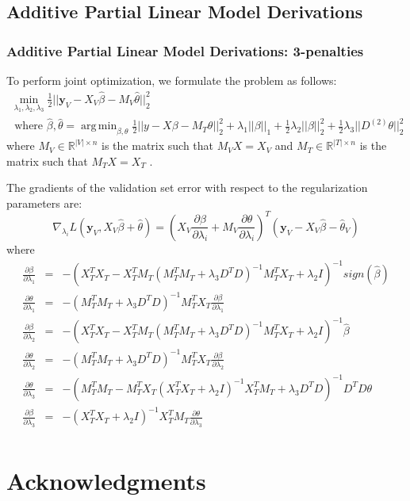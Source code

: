 \documentclass[10pt,letterpaper]{article}
\DeclareMathOperator*{\argmin}{arg\,min}
\begin{document}
\subsection{Additive Partial Linear Model Derivations}

\subsubsection{Additive Partial Linear Model Derivations: 3-penalties}

To perform joint optimization, we formulate the problem as follows:
\begin{multline}
\min_{\lambda_1, \lambda_2, \lambda_3} \frac{1}{2} \bigl\lvert\bigl\lvert \boldsymbol y_V - X_V\hat\beta - M_V \hat\theta \bigl\rvert\bigl\rvert^2_2 \\
\text{ where } \hat\beta, \hat\theta = \argmin_{\beta, \theta} \frac{1}{2} \bigl\lvert\bigl\lvert y - X\beta - M_T \theta \bigl\rvert\bigl\rvert^2_2
+ \lambda_1 \lvert\lvert \beta \rvert \rvert_1
+ \frac{1}{2} \lambda_2 \lvert\lvert \beta \rvert \rvert_2^2
+ \frac{1}{2} \lambda_3 \lvert\lvert D^{(2)} \theta \rvert \rvert_2^2
\end{multline}
where $M_V \in \mathbb{R}^{|V| \times n}$ is the matrix such that $M_V X = X_V$ and $M_T \in \mathbb{R}^{|T| \times n}$ is the matrix such that $M_T X = X_T$ .

The gradients of the validation set error with respect to the regularization parameters are:
\begin{equation}
\nabla_{\lambda_i} L(\boldsymbol y_V, X_V \hat \beta + \hat \theta) = (X_V \frac{\partial \beta}{\partial \lambda_i} + M_V \frac{\partial \theta}{\partial \lambda_i})^T(\boldsymbol y_V - X_V \hat \beta - \hat \theta_V)
\end{equation}
where
\begin{equation}
\begin{array}{lcl}
\frac{\partial \beta}{\partial \lambda_1} &=& -(X_T^T X_T - X_T^T M_T(M_T^T M_T + \lambda_3 D^TD)^{-1} M_T^T X_T + \lambda_2 I)^{-1} sign(\hat \beta) \\
\frac{\partial \theta}{\partial \lambda_1} &=& -(M_T^T M_T + \lambda_3 D^T D)^{-1}  M_T^T X_T \frac{\partial \beta}{\partial \lambda_1}
\\
\frac{\partial \beta}{\partial \lambda_2} &=& -(X_T^T X_T - X_T^T M_T(M_T^T M_T + \lambda_3 D^TD)^{-1} M_T^T X_T + \lambda_2 I)^{-1} \hat \beta \\
\frac{\partial \theta}{\partial \lambda_2} &=& -(M_T^T M_T + \lambda_3 D^T D)^{-1}  M_T^T X_T \frac{\partial \beta}{\partial \lambda_2}
\\
\frac{\partial \theta}{\partial \lambda_3} &=& -(M_T^T M_T - M_T^T X_T (X_T^TX_T + \lambda_2 I)^{-1} X_T^T M_T + \lambda_3 D^TD)^{-1} D^TD \theta
\\
\frac{\partial \beta}{\partial \lambda_3} &=& - (X_T^TX_T + \lambda_2 I)^{-1} X_T^T M_T \frac{\partial \theta}{\partial \lambda_3} \\
\end{array}
\end{equation}

\section*{Acknowledgments}




\end{document}
